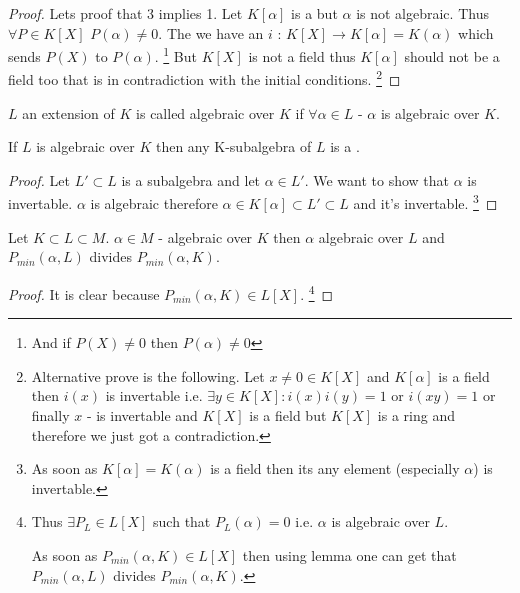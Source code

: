 \begin{proposition}
\begin{proof}
    Lets proof that 3 implies 1. Let $K\left[\alpha\right]$ is a
     but $\alpha$ is not algebraic. Thus $\forall P
    \in K\left[X\right]$ $P(\alpha) \ne 0$. The we have an
      $i$ :
    $K\left[X\right] \to K\left[\alpha\right] = K\left(\alpha\right)$
    which sends $P\left(X\right)$ to $P\left(\alpha\right)$.
    \footnote{
      And if $P\left(X\right) \ne 0$ then
      $P\left(\alpha\right) \ne 0$
    }
    But $K\left[X\right]$
    is not a field thus $K\left[\alpha\right]$ should not be a field
    too that is in contradiction with the initial conditions.
    \footnote{
      Alternative prove is the following.
      Let $x \ne 0 \in K\left[X\right]$ and $K\left[\alpha\right]$ is a
      field then $i(x)$ is invertable i.e. $\exists y \in
      K\left[X\right]:  i(x) i(y) = 1$ or 
      $i(xy) = 1$ or finally $x$ - is invertable and $K\left[X\right]$
      is a field but $K\left[X\right]$ is a ring and therefore we just
      got a contradiction. 
    }
  \end{proof}
  \label{prop:lec1_1}
\end{proposition}

\begin{definition}
  $L$ an extension of $K$ is called algebraic over $K$ if $\forall
  \alpha \in L$ - $\alpha$ is algebraic over $K$. 
  \label{def:algebraicextension}
\end{definition}

\begin{proposition}
  If $L$ is algebraic over $K$ then any K-subalgebra of $L$ is a
  .
  \begin{proof}
    Let $L' \subset L$ is a subalgebra and let $\alpha \in L'$. We want
    to show that $\alpha$ is invertable. $\alpha$ is algebraic
    therefore $\alpha \in K\left[\alpha\right] \subset L' \subset L$
    and it's invertable.
    \footnote{
      As soon as $K\left[\alpha\right] = K\left(\alpha\right)$ is a
      field then its any element (especially $\alpha$) is invertable. 
    }
  \end{proof}
  \label{prop:lec1_algebraicsubalgebra}
\end{proposition}

\begin{proposition}
  Let $K \subset L \subset M$. $\alpha \in M$ - algebraic over $K$
  then $\alpha$ algebraic over $L$ and
  $P_{min}\left(\alpha, L\right)$ divides $P_{min}\left(\alpha,
  K\right)$. 
  \begin{proof}
    It is clear because $P_{min}\left(\alpha,K\right) \in
    L\left[X\right]$.
    \footnote{
      Thus $\exists P_L \in L\left[X\right]$ such that
      $P_L\left(\alpha\right) = 0$ i.e. $\alpha$ is algebraic over $L$.
      
      As soon as $P_{min}\left(\alpha,K\right) \in L\left[X\right]$ then
      using lemma  one can get that
      $P_{min}\left(\alpha,L\right)$ divides
      $P_{min}\left(\alpha,K\right)$.
    }
  \end{proof}
  \label{prop:lec1_algebraic}
\end{proposition}

